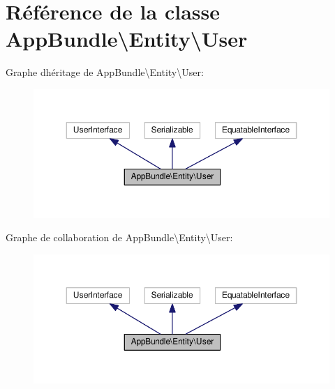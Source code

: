 \hypertarget{classAppBundle_1_1Entity_1_1User}{}\section{Référence de la classe App\+Bundle\textbackslash{}Entity\textbackslash{}User}
\label{classAppBundle_1_1Entity_1_1User}


Graphe d\textquotesingle{}héritage de App\+Bundle\textbackslash{}Entity\textbackslash{}User\+:\nopagebreak
\begin{figure}[H]
\begin{center}
\leavevmode
\includegraphics[width=350pt]{classAppBundle_1_1Entity_1_1User__inherit__graph}
\end{center}
\end{figure}


Graphe de collaboration de App\+Bundle\textbackslash{}Entity\textbackslash{}User\+:\nopagebreak
\begin{figure}[H]
\begin{center}
\leavevmode
\includegraphics[width=350pt]{classAppBundle_1_1Entity_1_1User__coll__graph}
\end{center}
\end{figure}
